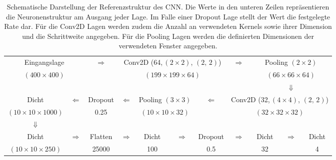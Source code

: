 \begin{table}[!b]
\centering
\footnotesize
 \begin{tabular}{|c|c|c|c|c|c|c|c|c|c|c|}
 \cline{1-2} \cline{4-7} \cline{9-11}
 \multicolumn{2}{|c|}{Eingangslage} & \multirow{2}{*}{$\Rightarrow$} & \multicolumn{4}{c|}{Conv2D (64,\,$(2\times 2)$, $(2,\,2)$)}&\multirow{2}{*}{$\Rightarrow$} & \multicolumn{3}{c|}{Pooling $(2\times 2)$} \\
 \cline{1-2} \cline{4-7} \cline{9-11}
 \multicolumn{2}{|c|}{$(400 \times 400)$} & & \multicolumn{4}{c|}{$(199 \times 199 \times 64)$} & & \multicolumn{3}{c|}{$(66 \times 66 \times 64)$} \\
 \cline{1-2} \cline{4-7} \cline{9-11}
 \multicolumn{8}{c}{}& \multicolumn{3}{c}{$\Downarrow$} \\
 \cline{1-1} \cline{3-3} \cline{5-6} \cline{8-11}
 Dicht & \multirow{2}{*}{$\Leftarrow$} & Dropout & \multirow{2}{*}{$\Leftarrow$} & \multicolumn{2}{c|}{Pooling $(3\times 3)$} &\multirow{2}{*}{$\Leftarrow$}  & \multicolumn{4}{c|}{Conv2D (32,\,$(4\times 4)$, $(2,\,2)$)} \\
 \cline{1-1} \cline{3-3} \cline{5-6} \cline{8-11}
 $(10\times 10\times 1000)$ & & 0.25 & &  \multicolumn{2}{c|}{$(10\times 10 \times 32)$} & & \multicolumn{4}{c|}{$(32 \times 32 \times 32)$} \\
 \cline{1-1} \cline{3-3} \cline{5-6} \cline{8-11}
 \multicolumn{1}{c}{ $\Downarrow$}& \multicolumn{10}{c}{} \\
  \cline{1-1} \cline{3-3} \cline{5-5} \cline{7-7} \cline{9-9} \cline{11-11}
  Dicht  & \multirow{2}{*}{$\Rightarrow$} & Flatten & \multirow{2}{*}{$\Rightarrow$} & Dicht & \multirow{2}{*}{$\Rightarrow$} & Dropout & \multirow{2}{*}{$\Rightarrow$} & Dicht & \multirow{2}{*}{$\Rightarrow$} & Dicht \\
  \cline{1-1} \cline{3-3} \cline{5-5} \cline{7-7} \cline{9-9} \cline{11-11}
  $(10\times 10\times 250)$ & &  25000 & & 100 & &0.5 & &32& & 4 \\
  \cline{1-1} \cline{3-3} \cline{5-5} \cline{7-7} \cline{9-9} \cline{11-11}
 \end{tabular}
 \caption{Schematische Darstellung der Referenzstruktur des CNN. Die Werte in den unteren Zeilen repräsentieren die Neuronenstruktur am Ausgang jeder Lage. Im Falle einer Dropout Lage stellt der Wert die festgelegte Rate dar. Für die Conv2D Lagen werden zudem die Anzahl an verwendeten Kernels sowie ihrer Dimension und die Schrittweite angegeben. Für die Pooling Lagen werden die definierten Dimensionen der verwendeten Fenster angegeben.}
 \label{fig:refstrukt}
\end{table}
